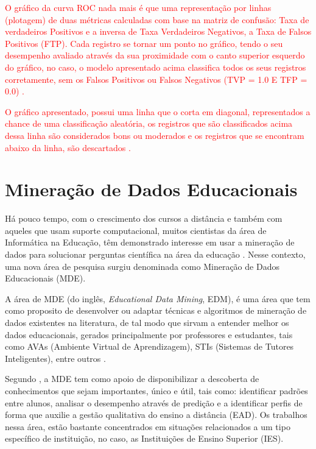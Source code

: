 \par
\textcolor{red}{O gráfico da curva ROC nada mais é que uma representação por linhas (plotagem) de duas métricas calculadas com base na matriz de confusão: Taxa de verdadeiros Positivos e a inversa de Taxa Verdadeiros Negativos, a Taxa de Falsos Positivos (FTP). Cada registro se tornar um ponto no gráfico, tendo o seu desempenho avaliado através da sua proximidade com o canto superior esquerdo do gráfico, no caso, o modelo apresentado acima classifica todos os seus registros corretamente, sem os Falsos Positivos ou Falsos Negativos (TVP = 1.0 E TFP = 0.0) \cite{Cesar, Carvalho2014}.}

\par
\textcolor{red}{O gráfico apresentado, possui uma linha que o corta em diagonal, representados a chance de uma classificação aleatória, os registros que são classificados acima dessa linha são considerados bons ou moderados e os registros que se encontram abaixo da linha, são descartados \cite{Carvalho2014}.}



\section{Mineração de Dados Educacionais}

\par
Há pouco tempo, com o crescimento dos cursos a distância e também com aqueles que usam suporte computacional, muitos cientistas da área de Informática na Educação, têm demonstrado interesse em usar a mineração de dados para solucionar perguntas científica na área da educação \cite{Baker2011}. Nesse contexto, uma nova área de pesquisa surgiu denominada como Mineração de Dados Educacionais (MDE).

\par
A área de MDE (do inglês, \textit{Educational Data Mining}, EDM), é uma área que tem como proposito de desenvolver ou adaptar técnicas e algoritmos de mineração de dados existentes na literatura, de tal modo que sirvam a entender melhor os dados educacionais, gerados principalmente por professores e estudantes, tais como AVAs (Ambiente Virtual de Aprendizagem), STIs (Sistemas de Tutores Inteligentes), entre outros \cite{Costa2012, Marques2014}.

\par
Segundo , a MDE tem como apoio de disponibilizar a descoberta de conhecimentos que sejam importantes, único e útil, tais como: identificar padrões entre alunos, analisar o desempenho através de predição e a identificar perfis de forma que auxilie a gestão qualitativa do ensino a distância (EAD). Os trabalhos nessa área, estão bastante concentrados em situações relacionados a um tipo específico de instituição, no caso, as Instituições de Ensino Superior (IES).

\par

